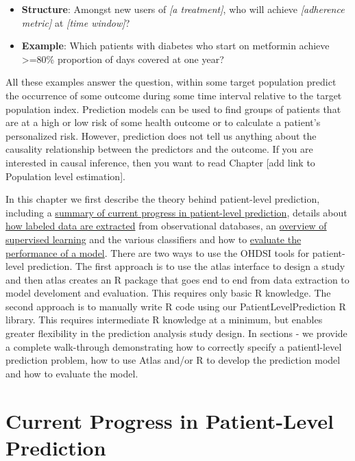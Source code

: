 \documentclass[11pt]{book}
\providecommand{\tightlist}{%
  \setlength{\itemsep}{0pt}\setlength{\parskip}{0pt}}
\begin{document}
\begin{itemize}
  \begin{itemize}
  \tightlist
  \item
    \textbf{Structure}: Amongst new users of \emph{{[}a treatment{]}},
    who will achieve \emph{{[}adherence metric{]}} at \emph{{[}time
    window{]}}?
  \item
    \textbf{Example}: Which patients with diabetes who start on
    metformin achieve \textgreater{}=80\% proportion of days covered at
    one year?
  \end{itemize}
\end{itemize}

All these examples answer the question, within some target population
predict the occurrence of some outcome during some time interval
relative to the target population index. Prediction models can be used
to find groups of patients that are at a high or low risk of some health
outcome or to calculate a patient's personalized risk. However,
prediction does not tell us anything about the causality relationship
between the predictors and the outcome. If you are interested in causal
inference, then you want to read Chapter {[}add link to Population level
estimation{]}.

In this chapter we first describe the theory behind patient-level
prediction, including a \protect\hyperlink{progress}{summary of current
progress in patient-level prediction}, details about
\protect\hyperlink{extracted}{how labeled data are extracted} from
observational databases, an \protect\hyperlink{supervised}{overview of
supervised learning} and the various classifiers and how to
\protect\hyperlink{evaluation}{evaluate the performance of a model}.
There are two ways to use the OHDSI tools for patient-level prediction.
The first approach is to use the atlas interface to design a study and
then atlas creates an R package that goes end to end from data
extraction to model develoment and evaluation. This requires only basic
R knowledge. The second approach is to manually write R code using our
PatientLevelPrediction R library. This requires intermediate R knowledge
at a minimum, but enables greater flexibility in the prediction analysis
study design. In sections - we provide a complete walk-through
demonstrating how to correctly specify a patientl-level prediction
problem, how to use Atlas and/or R to develop the prediction model and
how to evaluate the model.

\newpage

\hypertarget{progress}{\section{Current Progress in Patient-Level
Prediction}\label{progress}}
\end{document}
